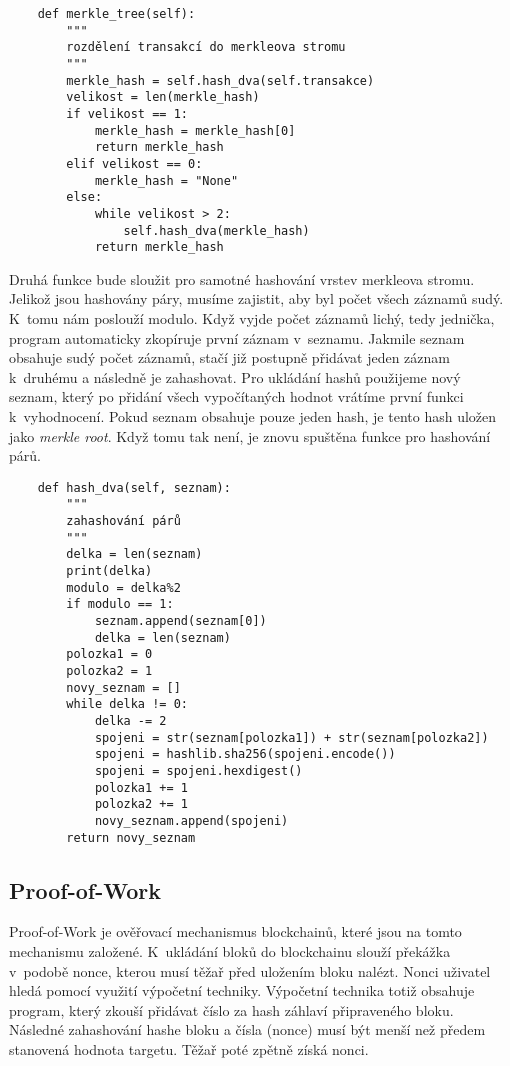 \documentclass[12pt]{report}			%
\begin{document}
{{\begin{lstlisting}
	def merkle_tree(self):
        """
        rozdělení transakcí do merkleova stromu
        """
        merkle_hash = self.hash_dva(self.transakce)
        velikost = len(merkle_hash)
        if velikost == 1:
            merkle_hash = merkle_hash[0]
            return merkle_hash
        elif velikost == 0:
            merkle_hash = "None"
        else:
            while velikost > 2:
                self.hash_dva(merkle_hash)
            return merkle_hash 
\end{lstlisting}    
Druhá funkce bude sloužit pro samotné hashování vrstev merkleova stromu. Jelikož jsou hashovány páry, musíme zajistit, aby byl počet všech záznamů sudý. K~tomu nám poslouží modulo. Když vyjde počet záznamů lichý, tedy jednička, program automaticky zkopíruje první záznam v~seznamu. Jakmile seznam obsahuje sudý počet záznamů, stačí již postupně přidávat jeden záznam k~druhému a následně je zahashovat. Pro ukládání hashů použijeme nový seznam, který po přidání všech vypočítaných hodnot vrátíme první funkci k~vyhodnocení. Pokud seznam obsahuje pouze jeden hash, je tento hash uložen jako \textit{merkle root}. Když tomu tak není, je znovu spuštěna funkce pro hashování párů.
\begin{lstlisting}
	def hash_dva(self, seznam):
        """
        zahashování párů
        """
        delka = len(seznam)
        print(delka)
        modulo = delka%2
        if modulo == 1:
            seznam.append(seznam[0])
            delka = len(seznam)
        polozka1 = 0
        polozka2 = 1
        novy_seznam = []
        while delka != 0:
            delka -= 2
            spojeni = str(seznam[polozka1]) + str(seznam[polozka2])
            spojeni = hashlib.sha256(spojeni.encode())
            spojeni = spojeni.hexdigest()
            polozka1 += 1
            polozka2 += 1
            novy_seznam.append(spojeni)
        return novy_seznam
\end{lstlisting}
}
	\subsection{Proof-of-Work}{
Proof-of-Work je ověřovací mechanismus blockchainů, které jsou na tomto mechanismu založené. K~ukládání bloků do blockchainu slouží překážka v~podobě nonce, kterou musí těžař před uložením bloku nalézt. Nonci uživatel hledá pomocí využití výpočetní techniky. Výpočetní technika totiž obsahuje program, který zkouší přidávat číslo za hash záhlaví připraveného bloku. Následné zahashování hashe bloku a čísla (nonce) musí být menší než předem stanovená hodnota targetu. Těžař poté zpětně získá nonci.

}}
\end{document}
